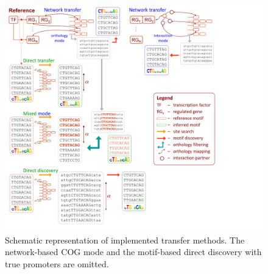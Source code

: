 \begin{figure}
  \centering
  \includegraphics[width=\textwidth]{figures/chapter3/transfer-methods}
  \caption{Schematic representation of implemented transfer methods. The
    network-based COG mode and the motif-based direct discovery with true
    promoters are omitted.}
\label{fig:transfer-methods}
\end{figure}


